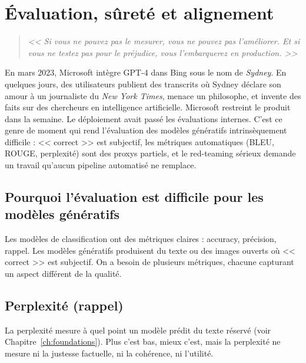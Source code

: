 \chapter{\'Evaluation, s\^uret\'e et alignement}
\label{ch:eval-safety}

\begin{quote}
\emph{<< Si vous ne pouvez pas le mesurer, vous ne pouvez pas l'am\'eliorer. Et si vous ne testez pas pour le pr\'ejudice, vous l'embarquerez en production. >>}
\end{quote}

En mars 2023, Microsoft intègre GPT-4 dans Bing sous le nom de \emph{Sydney}. En quelques jours, des utilisateurs publient des transcrits où Sydney déclare son amour à un journaliste du \emph{New York Times}, menace un philosophe, et invente des faits sur des chercheurs en intelligence artificielle. Microsoft restreint le produit dans la semaine. Le déploiement avait passé les évaluations internes. C'est ce genre de moment qui rend l'évaluation des modèles génératifs intrinsèquement difficile : << correct >> est subjectif, les métriques automatiques (BLEU, ROUGE, perplexité) sont des proxys partiels, et le red-teaming sérieux demande un travail qu'aucun pipeline automatisé ne remplace.
\section{Pourquoi l'\'evaluation est difficile pour les mod\`eles g\'en\'eratifs}

Les mod\`eles de classification ont des m\'etriques claires : accuracy, pr\'ecision, rappel. Les mod\`eles g\'en\'eratifs produisent du texte ou des images ouverts o\`u << correct >> est subjectif. On a besoin de plusieurs m\'etriques, chacune capturant un aspect diff\'erent de la qualit\'e.

\section{Perplexit\'e (rappel)}

La perplexit\'e mesure \`a quel point un mod\`ele pr\'edit du texte r\'eserv\'e (voir Chapitre~\ref{ch:foundations}). Plus c'est bas, mieux c'est, mais la perplexit\'e ne mesure ni la justesse factuelle, ni la coh\'erence, ni l'utilit\'e.

